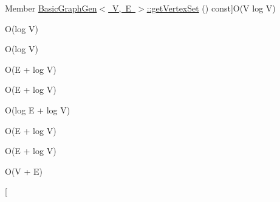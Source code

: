 \begin{DoxyRefList}
%
Member \mbox{\hyperlink{classBasicGraphGen_aec896ef5b1fc6044fc71318d1369f6f1}{Basic\+Graph\+Gen$<$ V, E $>$\+:\+:get\+Vertex\+Set}} () const]O(\+V log V)  
\item[\label{BigOh__BigOh000038}%
\Hypertarget{BigOh__BigOh000038}%
Member \mbox{\hyperlink{classBasicGraphGen_a5e874dbb2f9f2c7f98ec74f00790eb0e}{Basic\+Graph\+Gen$<$ V, E $>$\+:\+:operator\mbox{[}\mbox{]}}} (const std\+::string \&name)]O(log V)  
\item[\label{BigOh__BigOh000039}%
\Hypertarget{BigOh__BigOh000039}%
Member \mbox{\hyperlink{classBasicGraphGen_ad91a5b6ebd034841cf4f4c410fb7ed1b}{Basic\+Graph\+Gen$<$ V, E $>$\+:\+:operator\mbox{[}\mbox{]}}} (const std\+::string \&name) const]O(log V)  
\item[\label{BigOh__BigOh000029}%
\Hypertarget{BigOh__BigOh000029}%
Member \mbox{\hyperlink{classBasicGraphGen_adfee7a20d0c13cc515b3b7e951d8baf2}{Basic\+Graph\+Gen$<$ V, E $>$\+:\+:remove\+Edge}} (const std\+::string \&v1, const std\+::string \&v2, bool directed=true)]O(E + log V)  
\item[\label{BigOh__BigOh000030}%
\Hypertarget{BigOh__BigOh000030}%
Member \mbox{\hyperlink{classBasicGraphGen_a8b1003fbe63fab20173526459fff4139}{Basic\+Graph\+Gen$<$ V, E $>$\+:\+:remove\+Edge}} (Vertex\+Gen$<$ V, E $>$ $\ast$v1, Vertex\+Gen$<$ V, E $>$ $\ast$v2, bool directed=true)]O(E + log V)  
\item[\label{BigOh__BigOh000031}%
\Hypertarget{BigOh__BigOh000031}%
Member \mbox{\hyperlink{classBasicGraphGen_a2c6bb1e8e2c18b7376504692f7baae62}{Basic\+Graph\+Gen$<$ V, E $>$\+:\+:remove\+Edge}} (Edge\+Gen$<$ V, E $>$ $\ast$e, bool directed=true)]O(log E + log V)  
\item[\label{BigOh__BigOh000032}%
\Hypertarget{BigOh__BigOh000032}%
Member \mbox{\hyperlink{classBasicGraphGen_aaa33b4c05ee490d241ba5542420b985b}{Basic\+Graph\+Gen$<$ V, E $>$\+:\+:remove\+Vertex}} (const std\+::string \&name)]O(E + log V)  
\item[\label{BigOh__BigOh000033}%
\Hypertarget{BigOh__BigOh000033}%
Member \mbox{\hyperlink{classBasicGraphGen_a9eac2d17b5e8074dace019020d078acb}{Basic\+Graph\+Gen$<$ V, E $>$\+:\+:remove\+Vertex}} (Vertex\+Gen$<$ V, E $>$ $\ast$v)]O(E + log V)  
\item[\label{BigOh__BigOh000036}%
\Hypertarget{BigOh__BigOh000036}%
Member \mbox{\hyperlink{classBasicGraphGen_a66498d3675a5bc08fa30a032d41764f7}{Basic\+Graph\+Gen$<$ V, E $>$\+:\+:to\+Map}} () const]O(V + E)  
\item[\label{BigOh__BigOh000037}%

\end{DoxyRefList}
